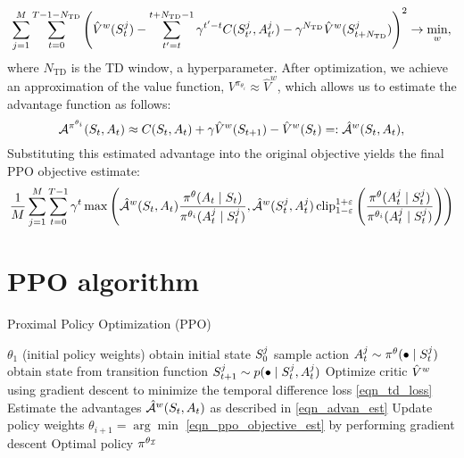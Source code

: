 \documentclass[12pt,twoside]{../../mitthesis}
\begin{document}
\begin{equation}
    \label{eqn_td_loss}
    \sum_{j=1}^M\sum_{t=0}^{T-1 - N_{\text{TD}}}\left(\hat{V}^w(S_t^j) - \sum_{t'=t}^{t + N_{\text{TD}} - 1} \gamma^{t'-t}C(S_{t'}^j, A_{t'}^j) - \gamma^{N_{\text{TD}}}\hat{V}^w(S_{t + N_{\text{TD}}}^j)\right)^2 \rightarrow \min_{w},
\end{equation}
where $N_{\text{TD}}$ is the TD window, a hyperparameter.
After optimization, we achieve an approximation of the value function, $V^{\pi_{\theta_i}} \approx \hat{V}^w$, which allows us to estimate the advantage function as follows: 
\begin{equation}
    \label{eqn_advan_est}
    \mathcal A^{\pi^{\theta_i}}(S_t, A_t) \approx C(S_t, A_t) + \gamma \hat{V}^w(S_{t+1}) - \hat{V}^w(S_t) =: \hat{\mathcal A}^{w}(S_t, A_t) ,
\end{equation}
Substituting this estimated advantage into the original objective yields the final PPO objective estimate:
\begin{equation}
    \label{eqn_ppo_objective_est}
    \frac{1}{M} \sum_{j = 1}^M \sum_{t=0}^{T-1} \gamma ^ t \max\left(\hat{\mathcal A}^{w}(S_t, A_t)   \frac{\pi^{\theta}(A_t \mid S_t)}{\pi^{\theta_i}(A_t^j \mid S_t^j)}, \hat{\mathcal A}^{w}(S_t^j, A_t^j) \operatorname{clip}_{1 - \varepsilon}^{1 + \varepsilon}\left(\frac{\pi^{\theta}(A_t^j \mid S_t^j)}{\pi^{\theta_i}(A_t^j \mid S_t^j)}\right) \right)
\end{equation}

\section*{PPO algorithm}
\begin{algorithm}
    \caption{Proximal Policy Optimization (PPO)}
    \label{alg:my-alg}
    \begin{algorithmic}
     $\theta_1$ (initial policy weights)
            \STATE obtain initial state $S_0^{j}$
                \STATE sample action $A_t^j \sim \pi^{\theta}(\bullet \mid S_t^{j})$
                \STATE obtain state from transition function $S_{t+1}^j \sim p(\bullet \mid S_t^j, A_t^j)$
            \ENDFOR
        \ENDFOR
        \STATE Optimize critic $\hat{V}^{w}$ using gradient descent to minimize the temporal difference loss \eqref{eqn_td_loss}
        \STATE Estimate the advantages $\hat{\mathcal A}^{w}(S_t, A_t)$ as described in \eqref{eqn_advan_est} 
        \STATE Update policy weights $\theta_{i + 1} = \arg\min$ \eqref{eqn_ppo_objective_est} by performing gradient descent 
    \ENDFOR
    \STATE \RETURN Optimal policy $\pi^{\theta_{\mathcal I}}$
    \end{algorithmic}
\end{algorithm}
\end{document}
